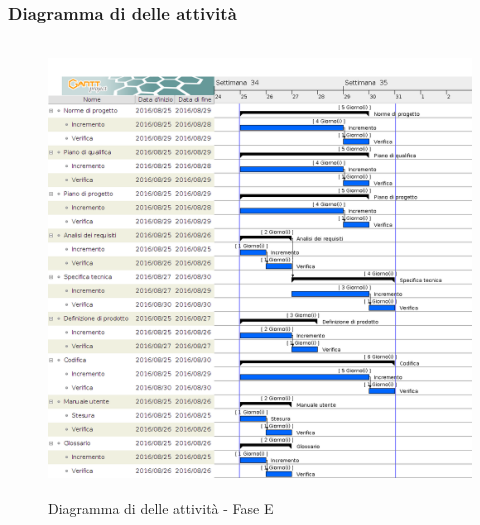 		\subsubsection{Diagramma di  delle attività}
		
		\begin{figure}[!h]
			\centering
			\includegraphics[height=12cm, width=15cm]{img/gantt/RD} 
			\caption{Diagramma di  delle attività - Fase E}
		\end{figure}
		
